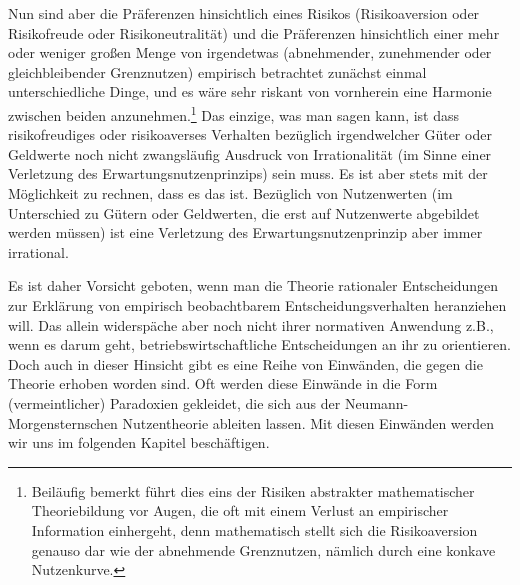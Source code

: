 Nun sind aber die Präferenzen hinsichtlich eines Risikos (Risikoaversion oder
Risikofreude oder Risikoneutralität) und die Präferenzen hinsichtlich einer mehr
oder weniger großen Menge von irgendetwas (abnehmender, zunehmender oder
gleichbleibender Grenznutzen) empirisch betrachtet zunächst einmal
unterschiedliche Dinge, und es wäre sehr riskant von vornherein eine Harmonie
zwischen beiden anzunehmen.\footnote{Beiläufig bemerkt führt dies eins der
Risiken abstrakter mathematischer Theoriebildung vor Augen, die oft mit einem
Verlust an empirischer Information einhergeht, denn mathematisch stellt sich die
Risikoaversion genauso dar wie der abnehmende Grenznutzen, nämlich durch eine
konkave Nutzenkurve.} Das einzige, was man sagen kann, ist dass risikofreudiges
oder risikoaverses Verhalten bezüglich irgendwelcher Güter oder Geldwerte noch
nicht zwangsläufig Ausdruck von Irrationalität (im Sinne einer Verletzung des
Erwartungsnutzenprinzips) sein muss. Es ist aber stets mit der Möglichkeit zu
rechnen, dass es das ist. Bezüglich von Nutzenwerten (im Unterschied zu Gütern
oder Geldwerten, die erst auf Nutzenwerte abgebildet werden müssen) ist eine
Verletzung des Erwartungsnutzenprinzip aber immer irrational.


Es ist daher Vorsicht geboten, wenn man die
Theorie rationaler Entscheidungen zur Erklärung von empirisch beobachtbarem
Entscheidungsverhalten heranziehen will. Das allein widerspäche aber noch nicht
ihrer normativen Anwendung z.B., wenn es darum geht, betriebswirtschaftliche
Entscheidungen an ihr zu orientieren. Doch auch in dieser Hinsicht gibt es eine
Reihe von Einwänden, die gegen die Theorie erhoben worden sind. Oft werden diese
Einwände in die Form (vermeintlicher) Paradoxien gekleidet, die sich aus der
Neumann-Morgensternschen Nutzentheorie ableiten lassen. Mit diesen Einwänden
werden wir uns im folgenden Kapitel beschäftigen.



